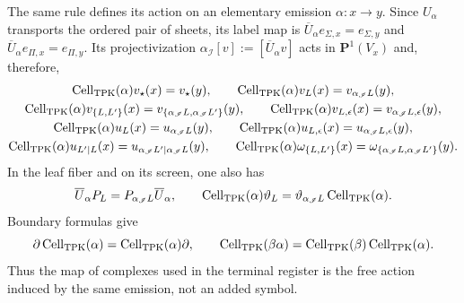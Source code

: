 The same rule defines its action on an elementary emission
\(\alpha:x\to y\). Since \(U_\alpha\) transports the ordered pair \emph{}
of sheets, its label map is
\(\overline U_\alpha e_{\Sigma,x}=e_{\Sigma,y}\) and
\(\overline U_\alpha e_{\Pi,x}=e_{\Pi,y}\). Its projectivization
\(\alpha_{\mathscr I}[v]:=[\overline U_\alpha v]\) acts in
\(\mathbf P^1(V_x)\) and, therefore,
\begin{equation}
\label{eq:pdfv2-cor-cell-accion-emision}
 \begin{gathered}
 \operatorname{Cell}_{\rm TPK}(\alpha)v_\star(x)=v_\star(y),\qquad
 \operatorname{Cell}_{\rm TPK}(\alpha)v_L(x)
   =v_{\alpha_{\mathscr I}L}(y),\\
 \operatorname{Cell}_{\rm TPK}(\alpha)v_{\{L,L'\}}(x)
   =v_{\{\alpha_{\mathscr I}L,\alpha_{\mathscr I}L'\}}(y),\qquad
 \operatorname{Cell}_{\rm TPK}(\alpha)v_{L,\epsilon}(x)
   =v_{\alpha_{\mathscr I}L,\epsilon}(y),\\
 \operatorname{Cell}_{\rm TPK}(\alpha)u_L(x)
   =u_{\alpha_{\mathscr I}L}(y),\qquad
 \operatorname{Cell}_{\rm TPK}(\alpha)u_{L,\epsilon}(x)
   =u_{\alpha_{\mathscr I}L,\epsilon}(y),\\
 \operatorname{Cell}_{\rm TPK}(\alpha)u_{L'\mid L}(x)
   =u_{\alpha_{\mathscr I}L'\mid\alpha_{\mathscr I}L}(y),\qquad
 \operatorname{Cell}_{\rm TPK}(\alpha)\omega_{\{L,L'\}}(x)
   =\omega_{\{\alpha_{\mathscr I}L,
                 \alpha_{\mathscr I}L'\}}(y).
 \end{gathered}
\end{equation}
In the leaf fiber and on its screen, one also has
\begin{equation}
\label{eq:pdfv2-cor-cell-entrelaza-proyectores-pantalla}
 \overline U_\alpha P_L=P_{\alpha_{\mathscr I}L}\overline U_\alpha,
 \qquad
 \operatorname{Cell}_{\rm TPK}(\alpha)\vartheta_L
 =\vartheta_{\alpha_{\mathscr I}L}
  \operatorname{Cell}_{\rm TPK}(\alpha).
\end{equation}
Boundary formulas give
\begin{equation}
\label{eq:pdfv2-cor-cell-accion-emision-natural}
 \partial\operatorname{Cell}_{\rm TPK}(\alpha)
 =\operatorname{Cell}_{\rm TPK}(\alpha)\partial,\qquad
 \operatorname{Cell}_{\rm TPK}(\beta\alpha)
 =\operatorname{Cell}_{\rm TPK}(\beta)
  \operatorname{Cell}_{\rm TPK}(\alpha).
\end{equation}
Thus the map of complexes used in the terminal register is the free action
induced by the same emission, not an added symbol.

